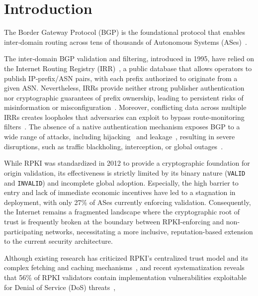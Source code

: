 \section{Introduction}
\label{sec:introduction}

The Border Gateway Protocol (BGP) is the foundational protocol that enables inter‐domain routing across tens of thousands of Autonomous Systems (ASes)~\cite{rfc4271}. 


The inter‐domain BGP validation and filtering, introduced in 1995, have relied on the Internet Routing Registry (IRR)~\cite{DuIRATSc23}, a public database that allows operators to publish IP‐prefix/ASN pairs, with each prefix authorized to originate from a given ASN. Nevertheless, IRRs provide neither strong publisher authentication nor cryptographic guarantees of prefix ownership, leading to persistent risks of misinformation or misconfiguration~\cite{MahajanWA02,KangLRKC24IRRedicator,DuIRATSc23}. Moreover, conflicting data across multiple IRRs creates loopholes that adversaries can exploit to bypass route‐monitoring filters~\cite{BirgeLeeAR25}.
The absence of a native authentication mechanism exposes BGP to a wide range of attacks, including hijacking~\cite {prefixHijacking} and leakage~\cite {McDanielSS21BGPLeak}, resulting in severe disruptions, such as traffic blackholing, interception, or global outages~\cite{butler2009survey}. 



While RPKI \cite{RPKI} was standardized in 2012 to provide a cryptographic foundation for origin validation, its effectiveness is strictly limited by its binary nature (\texttt{VALID} and \texttt{INVALID}) and incomplete global adoption. Especially, the high barrier to entry and lack of immediate economic incentives have led to a stagnation in deployment, with only 27\% of ASes currently enforcing validation. Consequently, the Internet remains a fragmented landscape where the cryptographic root of trust is frequently broken at the boundary between RPKI-enforcing and non-participating networks, necessitating a more inclusive, reputation-based extension to the current security architecture.



Although existing research has criticized RPKI's centralized trust model and its complex fetching and caching mechanisms~\cite{HlavacekSVW23BGPAdopt}, and recent systematization reveals that 56\% of RPKI validators contain implementation vulnerabilities exploitable for Denial of Service (DoS) threats~\cite{stoger2025vortex, mirdita2025sok}, 

